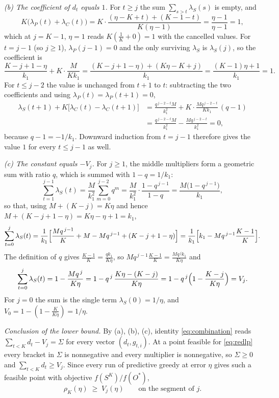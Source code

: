 \emph{(b) The coefficient of $d_t$ equals $1$.}  For $t\ge j$ the sum
$\sum_{s>t}\lambda_S(s)$ is empty, and
\[
  K\bigl(\lambda_P(t)+\lambda_C(t)\bigr)
  =K\cdot\frac{(\eta-K+t)+(K-1-t)}{K(\eta-1)}=\frac{\eta-1}{\eta-1}=1 ,
\]
which at $j=K-1$, $\eta=1$ reads $K(\tfrac1K+0)=1$ with the cancelled values.
For $t=j-1$ (so $j\ge1$), $\lambda_P(j-1)=0$ and the only surviving
$\lambda_S$ is $\lambda_S(j)$, so the coefficient is
\[
  \frac{K-j+1-\eta}{k_1}+K\cdot\frac{M}{Kk_1}
  =\frac{(K-j+1-\eta)+(K\eta-K+j)}{k_1}=\frac{(K-1)\eta+1}{k_1}=1 .
\]
For $t\le j-2$ the value is unchanged from $t+1$ to $t$: subtracting the two
coefficients and using $\lambda_P(t)=\lambda_P(t+1)=0$,
\begin{align*}
  \lambda_S(t+1)+K\bigl[\lambda_C(t)-\lambda_C(t+1)\bigr]
  &=\frac{q^{\,j-2-t}M}{k_1^{2}}
   +K\cdot\frac{M q^{\,j-2-t}}{Kk_1}\,(q-1)\\
  &=\frac{q^{\,j-2-t}M}{k_1^{2}}-\frac{Mq^{\,j-2-t}}{k_1^{2}}=0,
\end{align*}
because $q-1=-1/k_1$.  Downward induction from $t=j-1$ therefore gives the
value $1$ for every $t\le j-1$ as well.

\emph{(c) The constant equals $-V_j$.}  For $j\ge1$, the middle multipliers
form a geometric sum with ratio $q$, which is summed with $1-q=1/k_1$:
\[
  \sum_{t=1}^{j-1}\lambda_S(t)=\frac{M}{k_1^{2}}\sum_{m=0}^{j-2}q^{m}
  =\frac{M}{k_1^{2}}\cdot\frac{1-q^{\,j-1}}{1-q}
  =\frac{M\bigl(1-q^{\,j-1}\bigr)}{k_1},
\]
so that, using $M+(K-j)=K\eta$ and hence $M+(K-j+1-\eta)=K\eta-\eta+1=k_1$,
\[
  \sum_{t=0}^{j}\lambda_S(t)
  =\frac{1}{k_1}\Bigl[\frac{Mq^{\,j-1}}{K}+M-Mq^{\,j-1}+(K-j+1-\eta)\Bigr]
  =\frac{1}{k_1}\Bigl[k_1-Mq^{\,j-1}\frac{K-1}{K}\Bigr].
\]
The definition of $q$ gives $\frac{K-1}{K}=\frac{qk_1}{K\eta}$, so
$Mq^{\,j-1}\frac{K-1}{K}=\frac{Mq^{\,j}k_1}{K\eta}$ and
\[
  \sum_{t=0}^{j}\lambda_S(t)=1-\frac{Mq^{\,j}}{K\eta}
  =1-q^{\,j}\,\frac{K\eta-(K-j)}{K\eta}
  =1-q^{\,j}\Bigl(1-\frac{K-j}{K\eta}\Bigr)=V_j .
\]
For $j=0$ the sum is the single term $\lambda_S(0)=1/\eta$, and
$V_0=1-(1-\tfrac{K}{K\eta})=1/\eta$.

\emph{Conclusion of the lower bound.}  By (a), (b), (c), identity
\eqref{eq:combination} reads $\sum_{t<K}d_t-V_j=\Sigma$ for every vector
$(d_t,g_{t,i})$.  At a point feasible for \eqref{eq:redlp} every bracket in
$\Sigma$ is nonnegative and every multiplier is nonnegative, so $\Sigma\ge0$
and $\sum_{t<K}d_t\ge V_j$.  Since every run of predictive greedy at error
$\eta$ gives such a feasible point with objective $f(S^{K})/f(O^{\ast})$,
\[
  \rho_K(\eta)\;\ge\;V_j(\eta)\qquad\text{on the segment of $j$.}
\]

